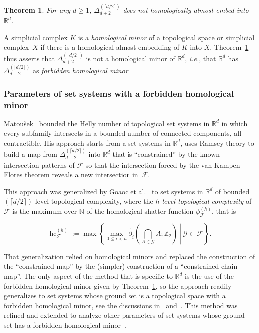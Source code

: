 \documentclass[a4paper,UKenglish,thm-restate]{article}
\newcommand{\R}{\mathbb{R}}
\newcommand{\Z}{\mathbb{Z}}
\newcommand{\N}{\mathbb{N}}
\newcommand{\F}{\mathcal{F}}
\newcommand{\G}{\mathcal{G}}
\DeclareMathOperator{\hc}{hc}
\newcommand{\defn}[1]{\emph{\color{violet}#1}}
\newcommand{\pth}[1]{\left(#1\right)}
\newtheorem{theorem}{Theorem}
\begin{document}
\begin{theorem}
  \label{t:homological-vKF}
  For any $d \ge 1$, $\Delta_{d+2}^{(\lceil d/2 \rceil)}$ does not homologically almost embed into $\R^d$.
\end{theorem}

\noindent
A simplicial complex $K$ is a \defn{homological minor} of a topological space or simplicial complex~$X$ if there is a homological almost-embedding of $K$ into $X$. Theorem~\ref{t:homological-vKF} thus asserts that $\Delta_{d+2}^{(\lceil d/2 \rceil)}$ is not a homological minor of $\R^{d}$, \emph{i.e.}, that $\R^{d}$ has $\Delta_{d+2}^{(\lceil d/2 \rceil)}$ as \defn{forbidden homological minor}. 


\subsubsection{Parameters of set systems with a forbidden homological minor}

Matou\v sek~\cite{m-httucs-97} bounded the Helly number of topological set systems in $\R^d$ in which every subfamily intersects in a bounded number of connected components, all contractible. His approach starts from a set systems in $\R^d$, uses Ramsey theory to build a map from $\Delta_{d+2}^{(\lceil d/2 \rceil)}$  into $\R^d$ that is ``constrained'' by the known intersection patterns of $\F$ so that the intersection forced by the van Kampen-Flores theorem reveals a new intersection in~$\F$.

\medskip

This approach was generalized by Goaoc et al.~\cite{hellyBetti} to set systems in $\R^d$ of bounded $(\lceil d/2 \rceil)$-level topological complexity, where the \defn{$h$-level topological complexity} of $\F$ is the maximum over $\N$ of the homological shatter function $\phi_{\F}^{(h)}$, that is

\begin{equation}\label{eq:topcomp}
  \hc_\F^{(h)} := \max\left\{\max_{0 \le i < h}\left.\tilde{\beta_i}\pth{\bigcap\limits_{A\in \G} A;\Z_2} \ \right| \ \G\subset \F\right\}.
\end{equation}

\noindent
That generalization relied on homological minors and replaced the construction of the ``constrained map'' by the (simpler) construction of a ``constrained chain map''. The only aspect of the method that is specific to $\R^d$ is the use of the forbidden homological minor given by Theorem~\ref{t:homological-vKF}, so the approach readily generalizes to set systems whose ground set is a topological space with a forbidden homological minor, see the discussions in~\cite[$\mathsection 5.2$]{patakova2022bounding} and~\cite[$\mathsection 2.2$]{steppingUp}. This method was refined and extended to analyze other parameters of set systems whose ground set has a forbidden homological minor~\cite{patakova2022bounding,patak2025sharper,steppingUp}.
\end{document}
